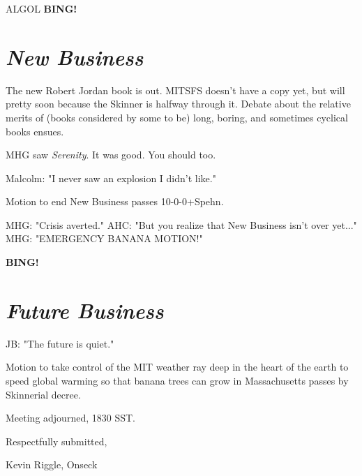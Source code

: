 \documentclass[10pt]{article}
\newcommand{\bing}{{\bf BING!} }
\newcommand{\goto}[1]{\bing \vskip 12pt \section*{{\em{#1}}}}
\begin{document}
ALGOL
\goto{New Business}

The new Robert Jordan book is out.  MITSFS doesn't have a copy yet, but will pretty soon because
the Skinner is halfway through it.  Debate about the relative merits of (books considered by
some to be) long, boring, and sometimes cyclical books ensues.

MHG saw \emph{Serenity}.  It was good.  You should too.

Malcolm: "I never saw an explosion I didn't like."

Motion to end New Business passes 10-0-0+Spehn.

MHG: "Crisis averted."
AHC: "But you realize that New Business isn't over yet..."
MHG: "EMERGENCY BANANA MOTION!"

\goto{Future Business}

JB: "The future is quiet."

Motion to take control of the MIT weather ray deep in the heart of the earth to speed global
warming so that banana trees can grow in Massachusetts passes by Skinnerial decree.

\vspace{12pt}

\noindent
Meeting adjourned, 1830 SST.

\vspace{18pt}

\centerline{Respectfully submitted,}
\centerline{Kevin Riggle, Onseck}
\end{document}
